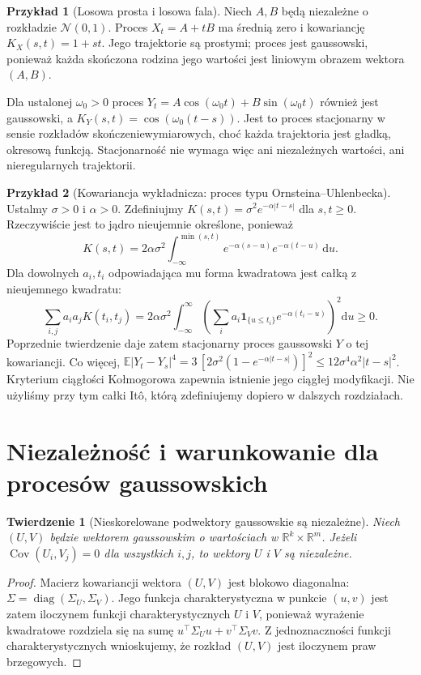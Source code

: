 \documentclass[11pt,a4paper,oneside]{report}
\numberwithin{equation}{chapter}
\theoremstyle{plain}
\newtheorem{twierdzenie}{Twierdzenie}[chapter]
\theoremstyle{definition}
\newtheorem{przyklad}{Przykład}[chapter]
\theoremstyle{remark}
\newcommand{\R}{\mathbb{R}}
\newcommand{\E}{\mathbb{E}}
\newcommand{\Cov}{\operatorname{Cov}}
\newcommand{\ind}[1]{\mathbf{1}_{#1}}
\newcommand{\dd}{\mathrm{d}}
\newcommand{\Normal}{\mathcal{N}}
\begin{document}
\begin{przyklad}[Losowa prosta i losowa fala]
Niech $A,B$ będą niezależne o rozkładzie $\Normal(0,1)$.
Proces $X_t=A+tB$ ma średnią zero i kowariancję
$K_X(s,t)=1+st$. Jego trajektorie są prostymi; proces jest
gaussowski, ponieważ każda skończona rodzina jego wartości
jest liniowym obrazem wektora $(A,B)$.

Dla ustalonej $\omega_0>0$ proces
$Y_t=A\cos(\omega_0t)+B\sin(\omega_0t)$ również jest gaussowski,
a $K_Y(s,t)=\cos(\omega_0(t-s))$. Jest to proces stacjonarny
w sensie rozkładów skończeniewymiarowych, choć każda trajektoria
jest gładką, okresową funkcją. Stacjonarność nie wymaga więc
ani niezależnych wartości, ani nieregularnych trajektorii.
\end{przyklad}

\begin{przyklad}[Kowariancja wykładnicza: proces typu Ornsteina--Uhlenbecka]
Ustalmy $\sigma>0$ i $\alpha>0$. Zdefiniujmy
$K(s,t)=\sigma^2 e^{-\alpha|t-s|}$ dla $s,t\ge0$.
Rzeczywiście jest to jądro nieujemnie określone, ponieważ
\[
K(s,t)=2\alpha\sigma^2\int_{-\infty}^{\min(s,t)}
 e^{-\alpha(s-u)}e^{-\alpha(t-u)}\,\dd u.
\]
Dla dowolnych $a_i,t_i$ odpowiadająca mu forma kwadratowa jest
całką z nieujemnego kwadratu:
\[
\sum_{i,j}a_ia_jK(t_i,t_j)=2\alpha\sigma^2\int_{-\infty}^\infty
\left(\sum_i a_i\ind{\{u\le t_i\}}e^{-\alpha(t_i-u)}\right)^2\dd u\ge0.
\]
Poprzednie twierdzenie daje zatem stacjonarny proces gaussowski
$Y$ o tej kowariancji. Co więcej,
$\E|Y_t-Y_s|^4=3\,[2\sigma^2(1-e^{-\alpha|t-s|})]^2
\le12\sigma^4\alpha^2|t-s|^2$.
Kryterium ciągłości Kołmogorowa zapewnia istnienie jego ciągłej
modyfikacji. Nie użyliśmy przy tym całki Itô, którą zdefiniujemy
dopiero w dalszych rozdziałach.
\end{przyklad}

\section{Niezależność i warunkowanie dla procesów gaussowskich}
\begin{twierdzenie}[Nieskorelowane podwektory gaussowskie są niezależne]
Niech $(U,V)$ będzie wektorem gaussowskim o wartościach
w $\R^k\times\R^m$. Jeżeli $\Cov(U_i,V_j)=0$
dla wszystkich $i,j$, to wektory $U$ i $V$ są niezależne.
\end{twierdzenie}
\begin{proof}
Macierz kowariancji wektora $(U,V)$ jest blokowo diagonalna:
$\Sigma=\operatorname{diag}(\Sigma_U,\Sigma_V)$.
Jego funkcja charakterystyczna w punkcie $(u,v)$ jest zatem
iloczynem funkcji charakterystycznych $U$ i $V$,
ponieważ wyrażenie kwadratowe rozdziela się na sumę
$u^\top\Sigma_Uu+v^\top\Sigma_Vv$.
Z jednoznaczności funkcji charakterystycznych wnioskujemy,
że rozkład $(U,V)$ jest iloczynem praw brzegowych.
\end{proof}
\end{document}
